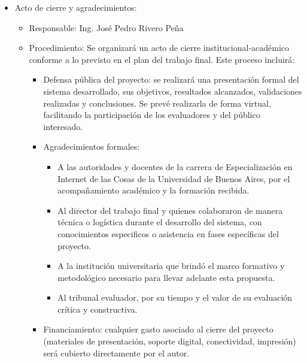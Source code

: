 \documentclass[
11pt, %
]{charter}
\begin{document}
\begin{itemize}
	\item Acto de cierre y agradecimientos:
	      \begin{itemize}
		      \item Responsable: Ing. José Pedro Rivero Peña
		      \item Procedimiento: Se organizará un acto de cierre institucional-académico conforme a lo previsto en el plan del trabajo final. Este proceso incluirá:
		            \begin{itemize}
			            \item Defensa pública del proyecto: se realizará una presentación formal del sistema desarrollado, sus objetivos, resultados alcanzados, validaciones realizadas y conclusiones. Se prevé realizarla de forma virtual, facilitando la participación de los evaluadores y del público interesado.
			            \item Agradecimientos formales:
			                  \begin{itemize}
				                  \item A las autoridades y docentes de la carrera de Especialización en Internet de las Cosas de la Universidad de Buenos Aires, por el acompañamiento académico y la formación recibida.
				                  \item Al director del trabajo final y quienes colaboraron de manera técnica o logística durante el desarrollo del sistema, con conocimientos especificos o asistencia en fases específicas del proyecto.
				                  \item A la institución universitaria que brindó el marco formativo y metodológico necesario para llevar adelante esta propuesta.
				                  \item Al tribunal evaluador, por su tiempo y el valor de su evaluación crítica y constructiva.
			                  \end{itemize}
			            \item Financiamiento: cualquier gasto asociado al cierre del proyecto (materiales de presentación, soporte digital, conectividad, impresión) será cubierto directamente por el autor.
		            \end{itemize}
	      \end{itemize}
\end{itemize}
\end{document}
